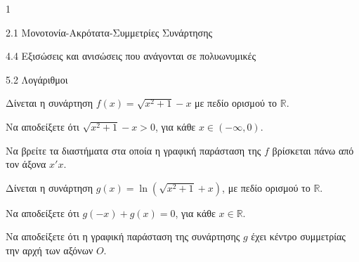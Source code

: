 \begin{ylh}{1}
\item 2.1 Μονοτονία-Ακρότατα-Συμμετρίες Συνάρτησης
\item 4.4 Εξισώσεις και ανισώσεις που ανάγονται σε πολυωνυμικές
\item 5.2 Λογάριθμοι
\end{ylh}
\begin{alist}
\item Δίνεται η συνάρτηση $f(x) = \sqrt{x^2 + 1} - x$ με πεδίο ορισμού το $\mathbb{R}$.
\end{alist}
\begin{alist}
\item
  Να αποδείξετε ότι $\sqrt{x^2 + 1} - x > 0$, για κάθε $x \in (-\infty, 0)$.
\end{alist}
\begin{alist}
\item
  Να βρείτε τα διαστήματα στα οποία η γραφική παράσταση της $f$ βρίσκεται πάνω από τον άξονα $x'x$.
\item Δίνεται η συνάρτηση $g(x) = \ln(\sqrt{x^2 + 1} + x)$, με πεδίο ορισμού το $\mathbb{R}$.
\end{alist}
\begin{alist}
\item
  Να αποδείξετε ότι $g(-x) + g(x) = 0$, για κάθε $x \in \mathbb{R}$.
\end{alist}
\begin{alist}
\item
  Να αποδείξετε ότι η γραφική παράσταση της συνάρτησης $g$ έχει κέντρο συμμετρίας την αρχή των αξόνων $O$.
\end{alist}


